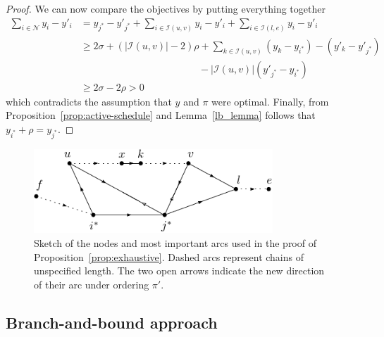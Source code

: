 \documentclass[a4paper]{article}
\theoremstyle{definition}
\theoremstyle{plain}
\begin{document}
\begin{proof}
  We can now compare the objectives by putting everything together
  \begin{align*}
    \sum_{i \in \mathcal{N}} y_{i} - y'_{i} &=  y_{j^{*}} - y'_{j^{*}} + \sum_{i \in \mathcal{I}(u, v)} y_{i} - y'_{i} + \sum_{i \in \mathcal{I}(l, e)} y_{i} - y'_{i} \\
    &\geq 2 \sigma + (|\mathcal{I}(u,v)| - 2) \rho + \sum_{k \in \mathcal{I}(u,v)} (y_{k} - y_{i^{*}}) - (y'_{k} - y'_{j^{*}}) \\ & \hspace{12em} - |\mathcal{I}(u,v)| (y'_{j^{*}} - y_{i^{*}}) \\
    &\geq 2 \sigma - 2 \rho > 0
  \end{align*}
  which contradicts the assumption that $y$ and $\pi$ were optimal.
  Finally, from Proposition~\ref{prop:active-schedule} and Lemma~\ref{lb_lemma}
  follows that $y_{i^{*}} + \rho = y_{j^{*}}$.
\end{proof}

\begin{figure}[H]
  \centering
  \includegraphics[width=0.8\textwidth]{figures/platoon-preservation-proof-diagram.pdf}
  \caption{Sketch of the nodes and most important arcs used in the proof of
    Proposition~\ref{prop:exhaustive}. Dashed arcs represent chains of
    unspecified length. The two open arrows indicate the new direction of their
    arc under ordering $\pi'$.}\label{fig:platoon-preservation-diagram}
\end{figure}


\subsection*{Branch-and-bound approach}
\end{document}

